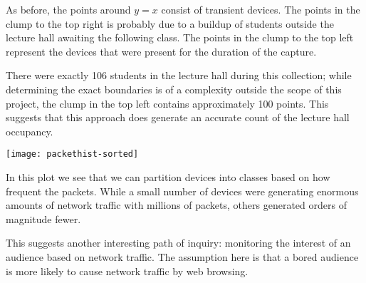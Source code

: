 As before, the points around \(y=x\) consist of transient devices.
The points in the clump to the top right is probably due to a buildup of students outside the lecture hall awaiting the following class.
The points in the clump to the top left represent the devices that were present for the duration of the capture.
	
There were exactly 106 students in the lecture hall during this collection; while determining the exact boundaries is of a complexity outside the scope of this project, the clump in the top left contains approximately 100 points.
This suggests that this approach does generate an accurate count of the lecture hall occupancy.

\begin{figure*}[!t]
  \texttt{[image: packethist-sorted]}
  \label{fig:probhist}
\end{figure*}

In this plot we see that we can partition devices into classes based on how frequent the packets.
While a small number of devices were generating enormous amounts of network traffic with millions of packets, others generated orders of magnitude fewer.
	
This suggests another interesting path of inquiry: monitoring the interest of an audience based on network traffic.
The assumption here is that a bored audience is more likely to cause network traffic by web browsing.
